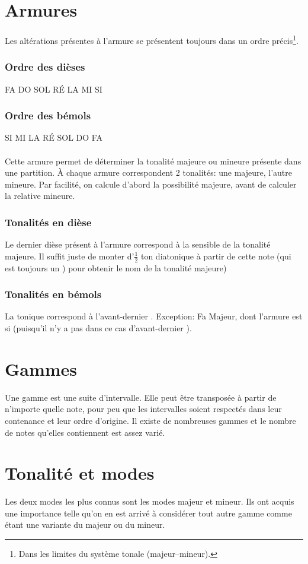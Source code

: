 \documentclass[11pt]{scrreprt}
\begin{document}
\section{Armures}
Les altérations présentes à l'armure se présentent toujours dans un ordre précis\footnote{Dans les limites du système tonale (majeur--mineur).}.
\subsubsection{Ordre des dièses}
FA DO SOL RÉ LA MI SI
\subsubsection{Ordre des bémols}
SI MI LA RÉ SOL DO FA
\\
\\
Cette armure permet de déterminer la tonalité majeure ou mineure présente dans une partition. À chaque armure correspondent 2 tonalités: une majeure, l'autre mineure. Par facilité, on calcule d'abord la possibilité majeure, avant de calculer la relative mineure.

\subsubsection{Tonalités en dièse}
Le dernier dièse présent à l'armure correspond à la sensible de la tonalité majeure. Il suffit juste de monter d'$\frac1 2$ ton diatonique à partir de cette note (qui est toujours un \sharp{}) pour obtenir le nom de la tonalité majeure)
\subsubsection{Tonalités en bémols}
La tonique correspond à l'avant-dernier \flat. Exception: Fa Majeur, dont l'armure est si \flat{} (puisqu'il n'y a pas dans ce cas d'avant-dernier \flat).
\section{Gammes}
Une gamme est une suite d'intervalle. Elle peut être transposée à partir de n'importe quelle note, pour peu que les intervalles soient respectés dans leur contenance et leur ordre d'origine. Il existe de nombreuses gammes et le nombre de notes qu'elles contiennent est assez varié.
\section{Tonalité et modes}
Les deux modes les plus connus sont les modes majeur  et mineur. Ils ont acquis une importance telle qu'on en est arrivé à considérer tout autre gamme comme étant une variante du majeur ou du mineur.
\end{document}
